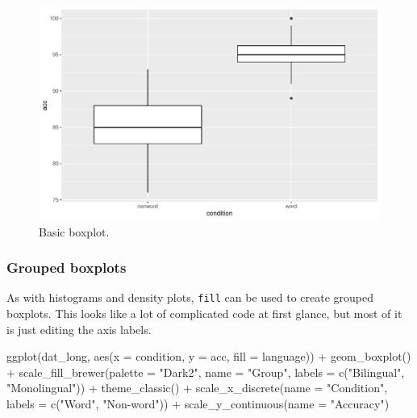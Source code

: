 \documentclass[
  english,
  doc,floatsintext]{apa6}
\newenvironment{Shaded}{\begin{snugshade}}{\end{snugshade}}
\newcommand{\AttributeTok}[1]{\textcolor[rgb]{0.77,0.63,0.00}{#1}}
\newcommand{\FunctionTok}[1]{\textcolor[rgb]{0.00,0.00,0.00}{#1}}
\newcommand{\NormalTok}[1]{#1}
\newcommand{\SpecialCharTok}[1]{\textcolor[rgb]{0.00,0.00,0.00}{#1}}
\newcommand{\StringTok}[1]{\textcolor[rgb]{0.31,0.60,0.02}{#1}}
\begin{document}
\begin{figure}

{\centering \includegraphics[width=1\linewidth]{images/boxplot1-1} 

}

\caption{Basic boxplot.}\label{fig:boxplot1}
\end{figure}

\hypertarget{grouped-boxplots}{%
\subsubsection{Grouped boxplots}\label{grouped-boxplots}}

As with histograms and density plots, \texttt{fill} can be used to create grouped boxplots. This looks like a lot of complicated code at first glance, but most of it is just editing the axis labels.

\begin{Shaded}
\begin{Highlighting}[]
\FunctionTok{ggplot}\NormalTok{(dat\_long, }\FunctionTok{aes}\NormalTok{(}\AttributeTok{x =}\NormalTok{ condition, }\AttributeTok{y =}\NormalTok{ acc, }\AttributeTok{fill =}\NormalTok{ language)) }\SpecialCharTok{+}
  \FunctionTok{geom\_boxplot}\NormalTok{() }\SpecialCharTok{+}
  \FunctionTok{scale\_fill\_brewer}\NormalTok{(}\AttributeTok{palette =} \StringTok{"Dark2"}\NormalTok{,}
                    \AttributeTok{name =} \StringTok{"Group"}\NormalTok{,}
                    \AttributeTok{labels =} \FunctionTok{c}\NormalTok{(}\StringTok{"Bilingual"}\NormalTok{, }\StringTok{"Monolingual"}\NormalTok{)) }\SpecialCharTok{+}
  \FunctionTok{theme\_classic}\NormalTok{() }\SpecialCharTok{+}
  \FunctionTok{scale\_x\_discrete}\NormalTok{(}\AttributeTok{name =} \StringTok{"Condition"}\NormalTok{,}
                   \AttributeTok{labels =} \FunctionTok{c}\NormalTok{(}\StringTok{"Word"}\NormalTok{, }\StringTok{"Non{-}word"}\NormalTok{)) }\SpecialCharTok{+}
  \FunctionTok{scale\_y\_continuous}\NormalTok{(}\AttributeTok{name =} \StringTok{"Accuracy"}\NormalTok{)}
\end{Highlighting}
\end{Shaded}
\end{document}
